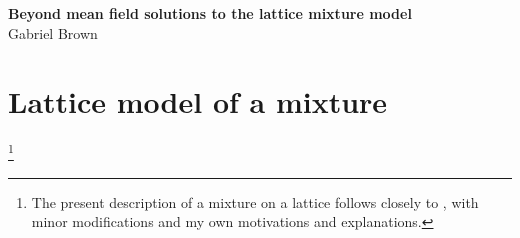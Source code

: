 \documentclass[10pt]{article}
\begin{document}
\begin{center}
    \textbf{\large Beyond mean field solutions to the lattice mixture model} \\
    Gabriel Brown
\end{center}

%

\section{Lattice model of a mixture} \footnote{The present description of a mixture on a lattice follows closely to \cite{dill}, with minor modifications and my own motivations and explanations.} 
\end{document}
